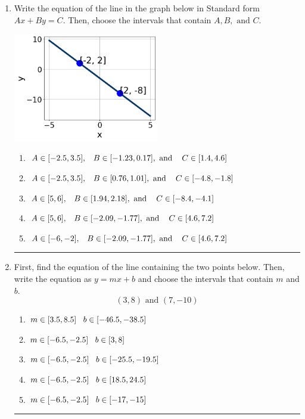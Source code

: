 \documentclass[14pt]{extbook}
\newcommand{\litem}[1]{\item#1\hspace*{-1cm}\rule{\textwidth}{0.4pt}}
\begin{document}
\begin{enumerate}
{\begin{enumerate}[label=\Alph*.]
\end{enumerate} }
\litem{
Write the equation of the line in the graph below in Standard form $Ax+By=C$. Then, choose the intervals that contain $A, B, \text{ and } C$.
\begin{center}
    \includegraphics[width=0.5\textwidth]{../Figures/linearGraphToStandardC.png}
\end{center}
\begin{enumerate}[label=\Alph*.]
\item \( A \in [-2.5, 3.5], \hspace{3mm} B \in [-1.23, 0.17], \text{ and } \hspace{3mm} C \in [1.4, 4.6] \)
\item \( A \in [-2.5, 3.5], \hspace{3mm} B \in [0.76, 1.01], \text{ and } \hspace{3mm} C \in [-4.8, -1.8] \)
\item \( A \in [5, 6], \hspace{3mm} B \in [1.94, 2.18], \text{ and } \hspace{3mm} C \in [-8.4, -4.1] \)
\item \( A \in [5, 6], \hspace{3mm} B \in [-2.09, -1.77], \text{ and } \hspace{3mm} C \in [4.6, 7.2] \)
\item \( A \in [-6, -2], \hspace{3mm} B \in [-2.09, -1.77], \text{ and } \hspace{3mm} C \in [4.6, 7.2] \)

\end{enumerate} }
\litem{
First, find the equation of the line containing the two points below. Then, write the equation as $ y=mx+b $ and choose the intervals that contain $m$ and $b$.\[ (3, 8) \text{ and } (7, -10) \]\begin{enumerate}[label=\Alph*.]
\item \( m \in [3.5, 8.5] \hspace*{3mm} b \in [-46.5, -38.5] \)
\item \( m \in [-6.5, -2.5] \hspace*{3mm} b \in [3, 8] \)
\item \( m \in [-6.5, -2.5] \hspace*{3mm} b \in [-25.5, -19.5] \)
\item \( m \in [-6.5, -2.5] \hspace*{3mm} b \in [18.5, 24.5] \)
\item \( m \in [-6.5, -2.5] \hspace*{3mm} b \in [-17, -15] \)


\end{enumerate}}
\end{enumerate}
\end{document}
